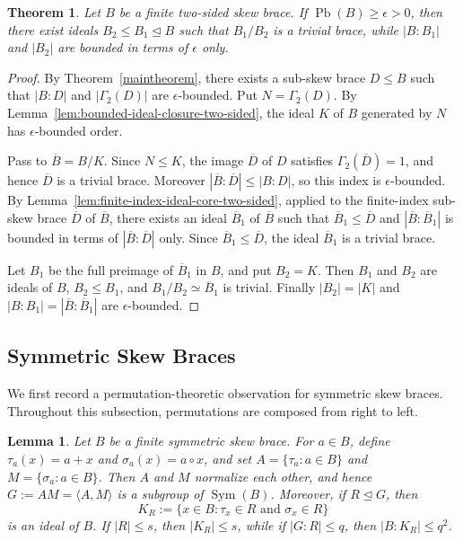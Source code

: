 \documentclass[11pt, oneside]{amsart}
\numberwithin{equation}{section}
\theoremstyle{plain}
\newtheorem{lem}[equation]{Lemma}
\newtheorem{thm}[equation]{Theorem}
\theoremstyle{definition}
\newcommand{\Pb}{\operatorname{Pb} }
\begin{document}
\begin{thm}\label{thm:bfc-ideals-two-sided}
Let $B$ be a finite two-sided skew brace. If $\Pb(B)\geqslant\epsilon>0$, then there exist ideals $B_2\leqslant B_1\trianglelefteq B$ such that $B_1/B_2$ is a trivial brace, while $|B:B_1|$ and $|B_2|$ are bounded in terms of $\epsilon$ only.
\end{thm}
\begin{proof}
By Theorem~\ref{maintheorem}, there exists a sub-skew brace
$D\leqslant B$ such that $|B:D|$ and $|\Gamma_2(D)|$ are $\epsilon$-bounded. Put $N=\Gamma_2(D)$. By Lemma~\ref{lem:bounded-ideal-closure-two-sided}, the ideal $K$ of $B$ generated by $N$ has $\epsilon$-bounded order.

Pass to $\overline B=B/K$. Since $N\leqslant K$, the image $\overline D$ of $D$ satisfies $\Gamma_2(\overline D)= 1$, and hence $\overline D$ is a trivial brace. Moreover $|\overline B:\overline D| \leqslant |B:D|$, so this index is $\epsilon$-bounded. By Lemma~\ref{lem:finite-index-ideal-core-two-sided}, applied to the
finite-index sub-skew brace $\overline D$ of $\overline B$, there exists an
ideal $\overline B_1$ of $\overline B$ such that $\overline B_1\leqslant\overline D$
and $|\overline B:\overline B_1|$ is bounded in terms of
$|\overline B:\overline D|$ only. Since $\overline B_1\leqslant \overline D$, the ideal $\overline B_1$ is a trivial brace.

Let $B_1$ be the full preimage of $\overline B_1$ in $B$, and put $B_2=K$. Then $B_1$ and $B_2$ are ideals of $B$, $B_2\leqslant B_1$, and
$B_1/B_2\simeq\overline B_1$ is trivial. Finally $|B_2|=|K|$ and
$|B:B_1| = |\overline B:\overline B_1|$ are $\epsilon$-bounded.
\end{proof}

\subsection{Symmetric Skew Braces}

We first record a permutation-theoretic observation for symmetric skew braces. Throughout this subsection, permutations are composed from right to left.

\begin{lem}\label{lem:symmetric-permutation-bridge}
Let $B$ be a finite symmetric skew brace. For $a\in B$, define $\tau_a(x)=a+x$ and $\sigma_a(x)=a\circ x$, and set $A=\{\tau_a:a\in B\}$ and $M=\{\sigma_a:a\in B\}$. Then $A$ and $M$ normalize each other, and hence $G:=AM=\langle A,M\rangle$ is a subgroup of $\operatorname{Sym}(B)$. Moreover, if $R\unlhd G$, then
$$
K_R:=\{x\in B:\tau_x\in R\text{ and }\sigma_x\in R\}
$$
is an ideal of $B$. If $|R|\leqslant s$, then $|K_R|\leqslant s$, while if $|G:R|\leqslant q$, then $|B:K_R|\leqslant q^2$.
\end{lem}
\end{document}
